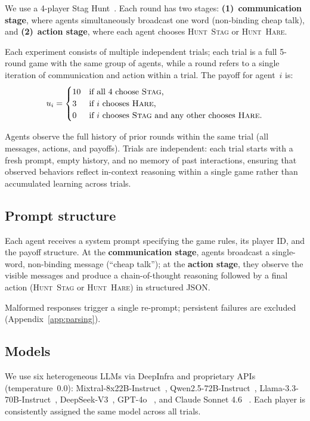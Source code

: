 \documentclass[runningheads]{llncs}
\newcommand{\tsc}[1]{\textsc{#1}}
\begin{document}
We use a 4-player Stag Hunt~\cite{madmoun2026communication}.  
Each round has two stages:  
\textbf{(1)}~\textbf{communication stage}, where agents simultaneously broadcast one word (non-binding cheap talk), and  
\textbf{(2)}~\textbf{action stage}, where each agent chooses \tsc{Hunt~Stag} or \tsc{Hunt~Hare}.  

Each experiment consists of multiple independent trials; each trial is a full 5-round game with the same group of agents, while a round refers to a single iteration of communication and action within a trial.
The payoff for agent~$i$ is:
\begin{equation*}\label{eq:payoff}
u_i = \begin{cases}
10 & \text{if all 4 choose \tsc{Stag},} \\
3 & \text{if } i \text{ chooses \tsc{Hare},} \\
0 & \text{if } i \text{ chooses \tsc{Stag} and any other chooses \tsc{Hare}.}
\end{cases}
\end{equation*}



Agents observe the full history of prior rounds within the same trial (all messages, actions, and payoffs). Trials are independent: each trial starts with a fresh prompt, empty history, and no memory of past interactions, ensuring that observed behaviors reflect in-context reasoning within a single game rather than accumulated learning across trials.

\subsection{Prompt structure}
Each agent receives a system prompt specifying the game rules, its player ID, and the payoff structure.
At the \textbf{communication stage}, agents broadcast a single-word, non-binding message (``cheap talk''); at the \textbf{action stage}, they observe the visible messages and produce a chain-of-thought reasoning followed by a final action (\tsc{Hunt~Stag} or \tsc{Hunt~Hare}) in structured JSON.

Malformed responses trigger a single re-prompt; persistent failures are excluded (Appendix~\ref{app:parsing}).

\subsection{Models}

We use six heterogeneous LLMs via DeepInfra and proprietary APIs (temperature~0.0):
Mixtral-8x22B-Instruct~\cite{jiang2024mixtral},
Qwen2.5-72B-Instruct~\cite{qwen2024qwen25},
Llama-3.3-70B-Instruct~\cite{grattafiori2024llama},
DeepSeek-V3~\cite{deepseek2024v3},
GPT-4o ~\cite{openai2024gpt4o}, and Claude Sonnet 4.6 ~\cite{anthropic2024claude}.
Each player is consistently assigned the same model across all trials.
\end{document}

